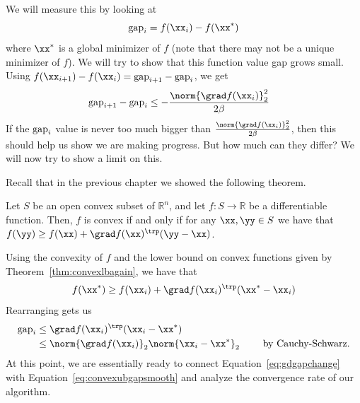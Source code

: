 We will measure this by looking at
\[
  \gap_i =  f(\xx_{i}) - f(\xx^*)
  \]
  where $\xx^*$ is a global minimizer of $f$ (note that there may not
  be a unique minimizer of $f$).
We will try to show that this function value gap grows small.
Using $f(\xx_{i+1})- f(\xx_{i}) =
  \gap_{i+1}- \gap_i $, we get
\begin{align}
\label{eq:gdgapchange}
 \gap_{i+1}- \gap_i &\leq - \frac{\norm{\grad
  f(\xx_{i})}_2^2}{2\beta}
\end{align}
If the $\text{gap}_i$  value is never too much bigger than $\frac{\norm{\grad
  f(\xx_{i})}_2^2}{2\beta}$, then this should help us show we are making
progress.
But how much can they differ? We will now try to show a limit on this.

Recall that in the previous chapter we showed the following theorem.
\begin{theorem}\label{thm:convexlbagain}
Let  $S$ be an open convex subset of $\mathbb{R}^n$, and
let $f:S\to \mathbb{R}$ be a differentiable function.
Then, $f$ is convex if and only if for any $\xx,\yy \in S$ we have that $f(\yy) \geq f(\xx) + \grad f(\xx)^\trp  (\yy-\xx)$.
\end{theorem}


Using the convexity of $f$ and the lower bound on
convex functions given by Theorem~\ref{thm:convexlbagain}, we have that
\begin{align}
\label{eq:basiciterlb}
f(\xx^*) \geq f(\xx_i) + \grad f(\xx_{i})^\trp (\xx^* - \xx_i)
\end{align}
Rearranging gets us
\begin{align}
\label{eq:convexubgapsmooth}
  \gap_i &\leq \grad f(\xx_{i})^\trp (\xx_i - \xx^*)
  \\
 & \leq \norm{\grad f(\xx_{i})}_2 \norm{\xx_i - \xx^*}_2
            \tag*{ by Cauchy-Schwarz.}
\end{align}
At this point, we are essentially ready to connect
Equation~\eqref{eq:gdgapchange} with Equation~\eqref{eq:convexubgapsmooth}
and analyze the convergence rate of our algorithm.

